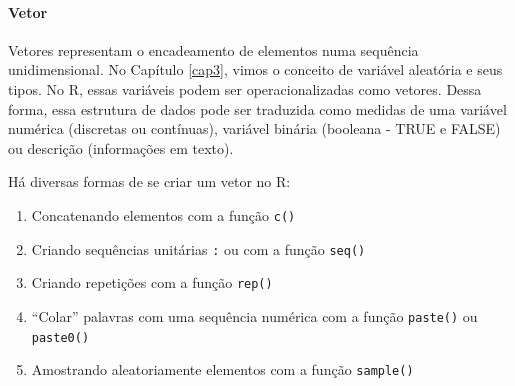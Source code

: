 \documentclass[
]{book}
\providecommand{\tightlist}{%
  \setlength{\itemsep}{0pt}\setlength{\parskip}{0pt}}
\begin{document}
\hypertarget{vetor}{%
\paragraph{Vetor}\label{vetor}}

Vetores representam o encadeamento de elementos numa sequência unidimensional. No Capítulo \ref{cap3}, vimos o conceito de variável aleatória e seus tipos. No R, essas variáveis podem ser operacionalizadas como vetores. Dessa forma, essa estrutura de dados pode ser traduzida como medidas de uma variável numérica (discretas ou contínuas), variável binária (booleana - TRUE e FALSE) ou descrição (informações em texto).

Há diversas formas de se criar um vetor no R:

\begin{enumerate}
\def\labelenumi{\arabic{enumi}.}
\tightlist
\item
  Concatenando elementos com a função \texttt{c()}
\item
  Criando sequências unitárias \texttt{:} ou com a função \texttt{seq()}
\item
  Criando repetições com a função \texttt{rep()}
\item
  ``Colar'' palavras com uma sequência numérica com a função \texttt{paste()} ou \texttt{paste0()}
\item
  Amostrando aleatoriamente elementos com a função \texttt{sample()}
\end{enumerate}
\end{document}
